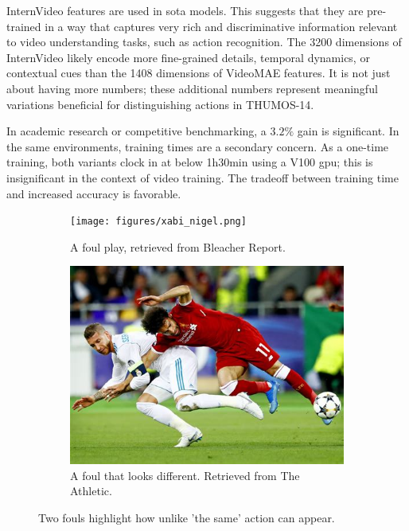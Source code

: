InternVideo features are used in \acrshort{sota} models. This suggests that they are pre-trained in a way that captures very rich and discriminative information relevant to video understanding tasks, such as action recognition. The 3200 dimensions of InternVideo likely encode more fine-grained details, temporal dynamics, or contextual cues than the 1408 dimensions of VideoMAE features. It is not just about having more numbers; these additional numbers represent meaningful variations beneficial for distinguishing actions in THUMOS-14.

In academic research or competitive benchmarking, a $3.2\%$ gain is significant. In the same environments, training times are a secondary concern. As a one-time training, both variants clock in at below 1h30min using a V100 \acrshort{gpu}; this is insignificant in the context of video training. The tradeoff between training time and increased accuracy is favorable. 


\begin{figure}
  \begin{subfigure}{0.42\textwidth}
    \texttt{[image: figures/xabi\_nigel.png]}
        \caption{A foul play, retrieved from Bleacher Report\cite{wyman_2018}.} 
        \label{fig:serious_foul}
  \end{subfigure}%
  \hspace*{\fill}   %
  \begin{subfigure}{0.42\textwidth}
    \includegraphics[width=\linewidth]{figures/salah_foul.png}
    \caption{A foul that looks different. Retrieved from The Athletic\cite{corrigan_2021}.} 
    \label{fig:another_foul}
  \end{subfigure}%
  \hspace*{\fill}   
  \caption{Two fouls highlight how unlike 'the same' action can appear. }
  \label{fig:different_fouls}
\end{figure}


